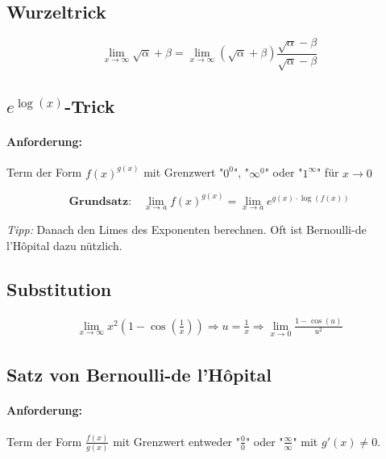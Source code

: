 \subsection{Wurzeltrick}

\begin{equation*}
	\lim_{x\to\infty} \sqrt{\alpha}+\beta = \lim_{x\to\infty}(\sqrt{\alpha}+\beta)\frac{\sqrt{\alpha}-\beta}{\sqrt{\alpha}-\beta}
\end{equation*}

\subsection{$e^{\log(x)}$-Trick}

\paragraph{Anforderung:}Term der Form $f(x)^{g(x)}$ mit Grenzwert "$0^0$", "$\infty^0$" oder "$1^\infty$" f{\"u}r $x \to 0$

\begin{equation*}
	\textbf{Grundsatz:}\quad\lim_{x\to a}f(x)^{g(x)} = \lim_{x\to a}e^{g(x) \cdot \log(f(x))}
\end{equation*}

\emph{Tipp:} Danach den Limes des Exponenten berechnen. Oft ist Bernoulli-de l'H{\^o}pital dazu n{\"u}tzlich.

\subsection{Substitution}

\begin{equation*}
\begin{split}
	\lim_{x\to \infty} x^2(1 - \cos(\frac{1}{x})) \Rightarrow u = \frac{1}{x} \Rightarrow \lim_{x\to 0} \frac{1 - \cos(u)}{u^2}
\end{split}
\end{equation*}

\subsection{Satz von Bernoulli-de l'H{\^o}pital}

\paragraph{Anforderung:}Term der Form $\frac{f(x)}{g(x)}$ mit Grenzwert entweder "$\frac{0}{0}$" oder "$\frac{\infty}{\infty}$" mit $g'(x) \neq 0$. \\

